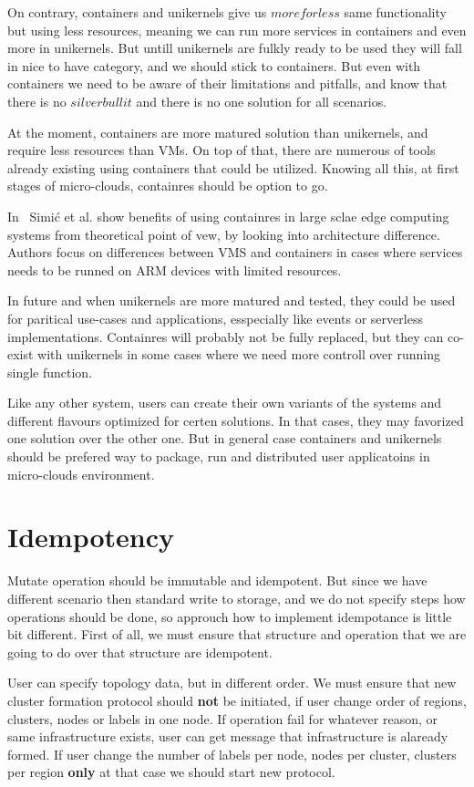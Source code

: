On contrary, containers and unikernels give us $more for less$ same functionality but using less resources, meaning we can run more services in containers and even more in unikernels. But untill unikernels are fulkly ready to be used they will fall in nice to have category, and we should stick to containers. But even with containers we need to be aware of their limitations and pitfalls, and know that there is no $silver bullit$ and there is no one solution for all scenarios.

At the moment, containers are more matured solution than unikernels, and require less resources than VMs. On top of that, there are numerous of tools already existing using containers that could be utilized. Knowing all this, at first stages of micro-clouds, containres should be option to go. 

In~\cite{inproceedingsSimic3} Simi\' c et al. show benefits of using containres in large sclae edge computing systems from theoretical point of vew, by looking into architecture difference. Authors focus on differences between VMS and containers in cases where services needs to be runned on ARM devices with limited resources.

In future and when unikernels are more matured and tested, they could be used for paritical use-cases and applications, esspecially like events or serverless implementations. Containres will probably not be fully replaced, but they can co-exist with unikernels in some cases where we need more controll over running single function.

Like any other system, users can create their own variants of the systems and different flavours optimized for certen solutions. In that cases, they may favorized one solution over the other one. But in general case containers and unikernels should be prefered way to package, run and distributed user applicatoins in micro-clouds environment.
%
%
\section{Idempotency}\label{sec:idempotency}
%
Mutate operation should be immutable and idempotent. But since we have different scenario then standard write to storage, and we do not specify steps how operations should be done, so approuch how to implement idempotance is little bit different. First of all, we must ensure that structure and operation that we are going to do over that structure are idempotent.

User can specify topology data, but in different order. We must ensure that new cluster formation protocol should \textbf{not} be initiated, if user change order of regions, clusters, nodes or labels in one node. If operation fail for whatever reason, or same infrastructure exists, user can get message that infrastructure is alaready formed. If user change the number of labels per node, nodes per cluster, clusters per region \textbf{only} at that case we should start new protocol.

